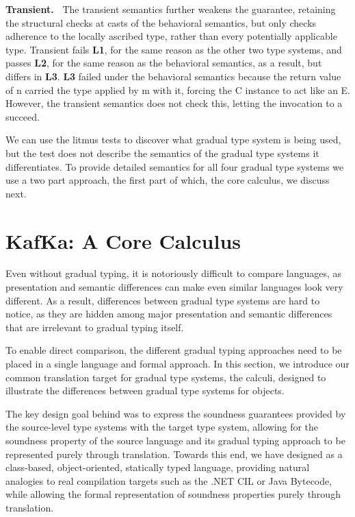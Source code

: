 \documentclass[a4paper,USenglish]{tex/lipics-v2016}
\begin{document}
{\bf Transient.~} The transient semantics further weakens the guarantee,
retaining the structural checks at casts of the behavioral semantics, but
only checks adherence to the locally ascribed type, rather than every
potentially applicable type. Transient fails {\bf L1}, for the same reason
as the other two type systems, and passes {\bf L2}, for the same reason as
the behavioral semantics, as a result, but differs in {\bf L3}. {\bf L3}
failed under the behavioral semantics because the return value of \xt n
carried the type applied by \xt m with it, forcing the \xt C instance to act
like an \xt E.  However, the transient semantics does not check this,
letting the invocation to \xt a succeed.

We can use the litmus tests to discover what gradual type system is being
used, but the test does not describe the semantics of the gradual type
systems it differentiates. To provide detailed semantics for all four
gradual type systems we use a two part approach, the first part of which,
the \kafka core calculus, we discuss next.


\section{KafKa: A Core Calculus}\label{kafkacore}

\noindent Even without gradual typing, it is notoriously difficult to compare
languages, as presentation and semantic differences can make even similar
languages look very different. As a result, differences between gradual type
systems are hard to notice, as they are hidden among major presentation and
semantic differences that are irrelevant to gradual typing itself.

To enable direct comparison, the different gradual typing approaches need to
be placed in a single language and formal approach. In this section, we
introduce our common translation target for gradual type systems, the \kafka
calculi, designed to illustrate the differences between gradual type systems
for objects.

The key design goal behind \kafka was to express the soundness guarantees
provided by the source-level type systems with the target type system,
allowing for the soundness property of the source language and its gradual
typing approach to be represented purely through translation. Towards this
end, we have designed \kafka as a class-based, object-oriented, statically
typed language, providing natural analogies to real compilation targets such
as the .NET CIL or Java Bytecode, while allowing the formal representation of
soundness properties purely through translation.
\end{document}
